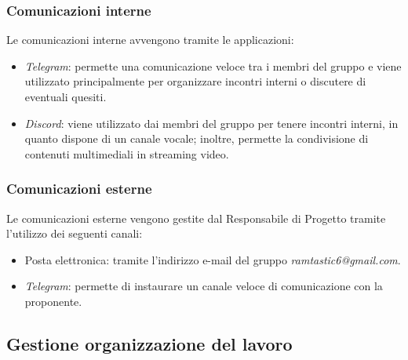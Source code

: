 \subsubsection{Comunicazioni interne}
Le comunicazioni interne avvengono tramite le applicazioni:
\begin{itemize}
    \item \textit{Telegram}: permette una comunicazione veloce tra i membri del gruppo e viene utilizzato principalmente per organizzare incontri interni o discutere di eventuali quesiti.
    \item \textit{Discord}: viene utilizzato dai membri del gruppo per tenere incontri interni, in quanto dispone di un canale vocale; inoltre, permette la condivisione di contenuti multimediali in streaming video.
\end{itemize}

\subsubsection{Comunicazioni esterne}
Le comunicazioni esterne vengono gestite dal Responsabile di Progetto tramite l’utilizzo dei seguenti
canali:
\begin{itemize}
    \item  Posta elettronica: tramite l’indirizzo e-mail del gruppo \textit{ramtastic6@gmail.com}.
    \item  \textit{Telegram}: permette di instaurare un canale veloce di comunicazione con la proponente.
\end{itemize}

\subsection{Gestione organizzazione del lavoro}
